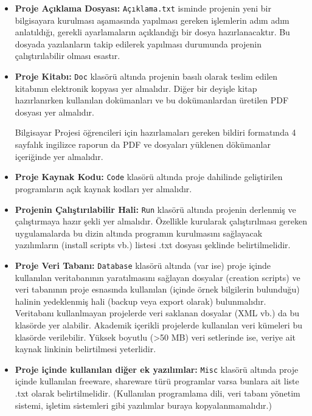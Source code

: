 \begin{itemize}
\item \textbf{Proje Açıklama Dosyası:} \texttt{Açıklama.txt} isminde projenin yeni bir bilgisayara kurulması aşamasında yapılması gereken işlemlerin adım adım anlatıldığı, gerekli ayarlamaların açıklandığı bir dosya hazırlanacaktır. Bu dosyada yazılanların takip edilerek yapılması durumunda projenin çalıştırılabilir olması esastır.

\item \textbf{Proje Kitabı:} \texttt{Doc} klasörü altında projenin basılı olarak teslim edilen kitabının elektronik kopyası yer almalıdır. Diğer bir deyişle kitap hazırlanırken kullanılan \latex dokümanları ve bu dokümanlardan üretilen PDF dosyası yer almalıdır. 

Bilgisayar Projesi öğrencileri için hazırlamaları gereken bildiri formatında 4 sayfalık ingilizce raporun da PDF ve \latex dosyaları yüklenen dökümanlar içeriğinde yer almalıdır.

\item \textbf{Proje Kaynak Kodu:} \texttt{Code} klasörü altında proje dahilinde geliştirilen programların açık kaynak kodları yer almalıdır.

\item \textbf{Projenin Çalıştırılabilir Hali:} \texttt{Run} klasörü altında projenin derlenmiş ve çalıştırmaya hazır şekli yer almalıdır. Özellikle kurularak çalıştırılması gereken uygulamalarda bu dizin altında programın kurulmasını sağlayacak yazılımların (install scripts vb.) listesi .txt dosyası şeklinde belirtilmelidir.

\item \textbf{Proje Veri Tabanı:} \texttt{Database} klasörü altında (var ise) proje içinde kullanılan veritabanının yaratılmasını sağlayan dosyalar (creation scripts) ve veri tabanının proje esnasında kullanılan (içinde örnek bilgilerin bulunduğu) halinin yedeklenmiş hali (backup veya export olarak) bulunmalıdır. Veritabanı kullanlmayan projelerde veri saklanan dosyalar (XML vb.) da bu klasörde yer alabilir. Akademik içerikli projelerde kullanılan veri kümeleri bu klasörde verilebilir. Yüksek boyutlu (>50 MB) veri setlerinde ise, veriye ait kaynak linkinin belirtilmesi yeterlidir.

\item \textbf{Proje içinde kullanılan diğer ek yazılımlar:} \texttt{Misc} klasörü altında proje içinde kullanılan freeware, shareware türü programlar varsa bunlara ait liste .txt olarak belirtilmelidir. (Kullanılan programlama dili, veri tabanı yönetim sistemi, işletim sistemleri gibi yazılımlar buraya kopyalanmamalıdır.)
\end{itemize}
